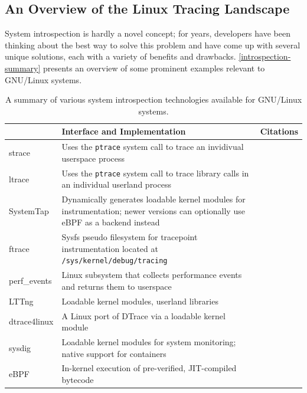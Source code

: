 \documentclass[
  12pt]{findlay}
\begin{document}
\hypertarget{an-overview-of-the-linux-tracing-landscape}{%
\subsection{An Overview of the Linux Tracing
Landscape}\label{an-overview-of-the-linux-tracing-landscape}}

\label{tracing-section}

System introspection is hardly a novel concept; for years, developers
have been thinking about the best way to solve this problem and have
come up with several unique solutions, each with a variety of benefits
and drawbacks. \autoref{introspection-summary} presents an overview of
some prominent examples relevant to GNU/Linux systems.

\begin{table}
\caption{A summary of various system introspection technologies available for GNU/Linux systems.}
\label{introspection-summary}
\begin{center}
\begin{tabular}{>{\ttfamily}lp{3.8in}l}
    \toprule
\multicolumn{1}{l}{name} & Interface and Implementation & Citations\\
    \midrule
strace & Uses the \texttt{ptrace} system call to trace an invidivual userspace process & \cite{strace, manstrace}  \\
ltrace & Uses the \texttt{ptrace} system call to trace library calls in an individual userland process & \cite{rubirabranco07, manltrace}  \\
SystemTap & Dynamically generates loadable kernel modules for instrumentation; newer versions can optionally use eBPF as a backend instead &  \cite{systemtap, merey17}\\
ftrace & Sysfs pseudo filesystem for tracepoint instrumentation located at \texttt{/sys/kernel/debug/tracing} & \cite{ftrace}\\
perf\_events & Linux subsystem that collects performance events and returns them to userspace & \cite{manperfeventopen}  \\
LTTng & Loadable kernel modules, userland libraries & \cite{lttng}\\
dtrace4linux & A Linux port of DTrace via a loadable kernel module & \cite{dtrace4linux} \\
sysdig & Loadable kernel modules for system monitoring; native support for containers & \cite{sysdig} \\
eBPF & In-kernel execution of pre-verified, JIT-compiled bytecode & \cite{bcc, goldstein16, starovoitov13, starovoitov14} \\
    \bottomrule
\end{tabular}
\end{center}
\end{table}
\end{document}
